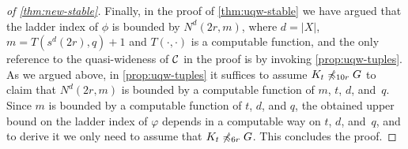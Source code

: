 \begin{proof}[of \cref{thm:new-stable}]
Finally, in the proof of \cref{thm:uqw-stable} we have argued that the ladder index of $\phi$ is bounded by $N^d(2r,m)$, where $d=|X|$, $m=T(s^d(2r),q)+1$
and $T(\cdot,\cdot)$ is a computable function,
and the only reference to the quasi-wideness of $\mathcal{C}$ in the proof
is by invoking \cref{prop:uqw-tuples}.
As we argued above, in \cref{prop:uqw-tuples} it suffices to assume $K_t\not\preccurlyeq_{10r} G$ to claim that $N^d(2r,m)$ is bounded by a computable function of $m$, $t$, $d$, and~$q$.
Since $m$ is bounded by a computable function of $t$, $d$, and $q$, the obtained upper bound on the ladder index of $\varphi$ depends in a computable way on $t$, $d$, and~$q$,
and to derive it we only need to assume that $K_t\not\preccurlyeq_{6r} G$. This concludes the proof.
\end{proof}

\begin{comment}
$N(\cdot,\cdot)$ be the function given by \cref{thm:new-uqw}.
	Following the proof of \cref{prop:uqw-tuples}, we see that for the functions $N^d(r,m)$ and $s^d(r)$, we can take the following functions:%
		\newcommand{\pow}{\ \uparrow\ }%
	\begin{align*}
	 N^d(r,m)&= c\cdot (m d)\pow(2(t+4))\pow(d(t+2r)),\\
	  s^d(r)&= d\cdot t,
	\end{align*}
where $x\pow y$ denotes $x^y$ and associates to the right, i.e., $x\pow y\pow z=x^(y^z)$.
In particular, the proof of \cref{prop:uqw-tuples} shows the following property
($\ast$)
for every graph $G$ such that $K_t\not\minor_{3r+1} G$ 
and for every set of $d$-tuples $A\subset V(G)^d$ of size at least $N^d(r,m)$
there is a subset $B\subset A$ of size $m$ and $S\subset V(G)$ of size at most $s^d(r)$
such that $B$ is mutually $r$-independent in $G-S$.

	
As in the proof of \cref{thm:uqw-stable}, let $r=7^q$,  
$s=s^d(2r)=d\cdot t$,  $T=(s+d)^d\cdot |\mathrm{Tp}_d^{q,s}|$ and $m=T+1$.



Let $\cal C$ be the class of all graphs $G$
such that $K_t\not\minor_{3r+1} G$, i.e., $K_t\not\minor_{3\cdot 7^q+1} G$. We repeat the argument presented in the second paragraph of the proof of \cref{thm:uqw-stable}, and assume that there is a $\phi$-ladder in $G\in \cal C$ of length larger than $N^d(2r,m)$.
 Instead of applying \cref{prop:uqw-tuples} we apply  ($\ast$) above
and obtain sets  $S$ and $B$ with the required properties. As before, this yields a contradiction. 


In particular, every $\phi$-ladder in a graph $G\in \cal C$ has length at most $N^d(2r,m)$, 
which is at most $$c'\cdot (d^{d+1}\cdot (t+1)^d\cdot |\mathrm{Tp}_d^{q,d\cdot t}|)\pow(2t+8)\pow(d\cdot t+2d\cdot 7^q),$$
where $c'$ is some constant.
As the number $|\mathrm{Tp}_d^{q,s}|$ is computable given $d,q,s$, this 
 yields \cref{thm:new-stable}.
\end{proof}
\end{comment}
